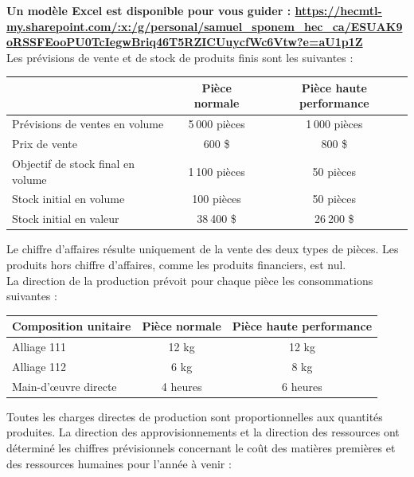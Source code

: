 \documentclass{kaobook}
\begin{document}
\textbf{Un modèle Excel est disponible pour vous guider : \url{https://hecmtl-my.sharepoint.com/:x:/g/personal/samuel\_sponem\_hec\_ca/ESUAK9oRSSFEooPU0TcIegwBriq46T5RZICUuycfWc6Vtw?e=aU1p1Z}}\\

Les prévisions de vente et de stock de produits finis sont les suivantes :\\

\begin{center}
\begin{tabular}{l c c}
 & Pièce normale & Pièce haute performance\\
\hline
Prévisions de ventes en volume & 5 000 pièces & 1 000 pièces\\
Prix de vente & 600 \$ & 800 \$\\
Objectif de stock final en volume & 1 100 pièces & 50 pièces\\
Stock initial en volume & 100 pièces & 50 pièces\\
Stock initial en valeur & 38 400 \$ & 26 200 \$\\
\end{tabular}
\end{center}

Le chiffre d’affaires résulte uniquement de la vente des deux types de pièces. Les produits hors chiffre d’affaires, comme les produits financiers, est nul.\\

La direction de la production prévoit pour chaque pièce les consommations suivantes :\\

\begin{center}
\begin{tabular}{l c c}
Composition unitaire & Pièce normale & Pièce haute performance\\
\hline
Alliage 111 & 12 kg & 12 kg\\
Alliage 112 & 6 kg & 8 kg\\
Main-d'œuvre directe & 4 heures & 6 heures\\
\end{tabular}
\end{center}

Toutes les charges directes de production sont proportionnelles aux quantités produites. La direction des approvisionnements et la direction des ressources ont déterminé les chiffres prévisionnels concernant le coût des matières premières et des ressources humaines pour l'année à venir :\\
\end{document}
